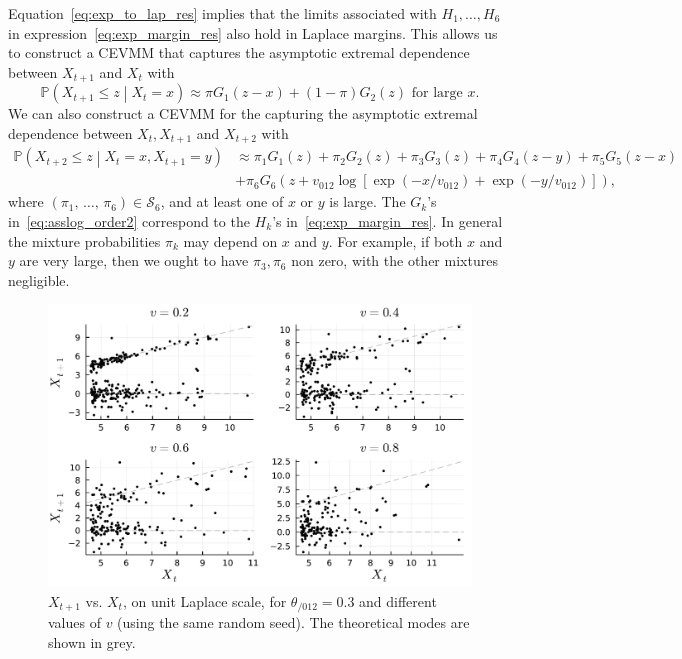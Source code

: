 \documentclass[11pt,twoside,openany]{book}
\newcommand{\prob}{\mathbb{P}}
\numberwithin{Theorem}{chapter}
\numberwithin{Definition}{chapter}
\numberwithin{Lemma}{chapter}
\numberwithin{Algorithm}{chapter}
\numberwithin{equation}{chapter}
\begin{document}
Equation~\eqref{eq:exp_to_lap_res} implies that the limits associated with $H_1,\ldots,H_6$
in expression~\eqref{eq:exp_margin_res}
also hold in Laplace margins. This allows us to construct a CEVMM that
captures the asymptotic extremal dependence between $X_{t+1}$ and $X_{t}$ with
\begin{equation}\label{eq:asslog_order1}
  \prob\left(X_{t+1}\leq z\middle| X_{t} = x\right) \approx \pi G_1 (z - x) + (1-\pi) G_2\left(z\right)
  \text{ for large }x.
\end{equation}
We can also construct a CEVMM for the capturing the asymptotic extremal dependence between
$X_{t},X_{t+1}$ and $X_{t+2}$ with
\begin{equation}\label{eq:asslog_order2}
  \begin{split}
    \prob\left(X_{t+2}\leq z\middle| X_{t} = x, X_{t+1}=y\right) &\approx
  \pi_{1} G_1 (z) + \pi_{2} G_2\left(z\right) + \pi_{3}G_3\left(z\right)
  +\pi_4 G_4(z - y)
  + \pi_5 G_5(z - x)\\
    &+ \pi_6 G_6(z + v_{012}\log[\exp(-x/v_{012})+\exp(-y/v_{012})]),
\end{split}
\end{equation}
where $(\pi_{1},\,\ldots,\,\pi_6)\in\mathcal{S}_6$, and at least one of $x$ or $y$
is large.
The $G_k$'s in~\eqref{eq:asslog_order2} correspond to the $H_k$'s in~\eqref{eq:exp_margin_res}.
In general the mixture probabilities $\pi_k$ may depend on $x$ and $y$.
For example, if both $x$ and $y$ are very large, then we ought to have $\pi_3,\pi_6$
non zero, with the other mixtures negligible.
\begin{figure}[htp]
  \centering
  \includegraphics[scale=0.75]{../asym-log/figures/3dim-x2-vs-x1-laplace-scale.pdf}
  \caption{$X_{t+1}$ vs. $X_{t}$, on unit Laplace scale, for
    $\theta_{/012}=0.3$ and
    different values of $v$ (using the same random
seed). The theoretical modes are shown in grey.}\label{fig:asslogx2vsx1} \end{figure}
\end{document}
